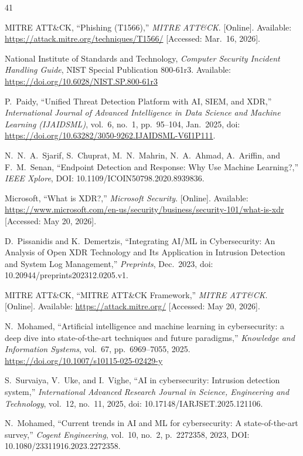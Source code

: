 \documentclass[12pt,a4paper]{report}
\begin{document}
\begin{thebibliography}{41}

MITRE ATT\&CK, ``Phishing (T1566),'' \textit{MITRE ATT\&CK\textregistered}.
[Online]. Available: \url{https://attack.mitre.org/techniques/T1566/}
[Accessed: Mar.\ 16, 2026].

National Institute of Standards and Technology, \textit{Computer Security Incident Handling
Guide}, NIST Special Publication 800-61r3. Available:
\url{https://doi.org/10.6028/NIST.SP.800-61r3}

P.\ Paidy,
``Unified Threat Detection Platform with AI, SIEM, and XDR,''
\textit{International Journal of Advanced Intelligence in Data Science and Machine Learning (IJAIDSML)},
vol.\ 6, no.\ 1, pp.\ 95--104, Jan.\ 2025,
doi: \url{https://doi.org/10.63282/3050-9262.IJAIDSML-V6I1P111}.

N.\ N.\ A.\ Sjarif, S.\ Chuprat, M.\ N.\ Mahrin, N.\ A.\ Ahmad, A.\ Ariffin, and
F.\ M.\ Senan, ``Endpoint Detection and Response: Why Use Machine Learning?,''
\textit{IEEE Xplore}, DOI: 10.1109/ICOIN50798.2020.8939836.

Microsoft, ``What is XDR?,'' \textit{Microsoft Security}.
[Online]. Available:
\url{https://www.microsoft.com/en-us/security/business/security-101/what-is-xdr}
[Accessed: May 20, 2026].

D.\ Pissanidis and K.\ Demertzis, ``Integrating AI/ML in Cybersecurity: An Analysis of Open
XDR Technology and Its Application in Intrusion Detection and System Log Management,''
\textit{Preprints}, Dec.\ 2023, doi: 10.20944/preprints202312.0205.v1.

MITRE ATT\&CK, ``MITRE ATT\&CK Framework,''
\textit{MITRE ATT\&CK\textregistered}.
[Online]. Available:
\url{https://attack.mitre.org/}
[Accessed: May 20, 2026].

N.\ Mohamed, ``Artificial intelligence and machine learning in cybersecurity: a deep dive into
state-of-the-art techniques and future paradigms,'' \textit{Knowledge and Information Systems},
vol.\ 67, pp.\ 6969--7055, 2025. \url{https://doi.org/10.1007/s10115-025-02429-y}

S.\ Survaiya, V.\ Uke, and I.\ Vighe, ``AI in cybersecurity: Intrusion detection system,''
\textit{International Advanced Research Journal in Science, Engineering and Technology},
vol.\ 12, no.\ 11, 2025, doi: 10.17148/IARJSET.2025.121106.

N.\ Mohamed, ``Current trends in AI and ML for cybersecurity: A state-of-the-art survey,''
\textit{Cogent Engineering}, vol.\ 10, no.\ 2, p.\ 2272358, 2023,
DOI: 10.1080/23311916.2023.2272358.


\end{thebibliography}
\end{document}
